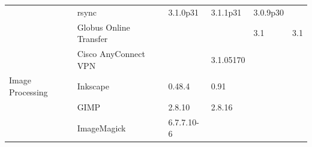 \begin{table}[!ht]
{\begin{tabular}{ll|l|l|l|l|}
\rowcolor{gray!25}
\cellcolor{white}                                                      & \multicolumn{1}{|l|}{rsync}                  & 3.1.0p31                                                            & 3.1.1p31                                                          & 3.0.9p30                                                               &                                                \\
\cline{2-6}
\cellcolor{white}                                                      & \multicolumn{1}{|l|}{Globus Online Transfer} &                                                                     &                                                                   & 3.1                                                                    & 3.1                                            \\
\cline{2-6}

\rowcolor{gray!25}
\cellcolor{white}                                                      & \multicolumn{1}{|l|}{Cisco AnyConnect VPN}   &                                                                     & 3.1.05170                                                         &                                                                        &                                                \\
\hline
\cellcolor{white} Image Processing                                     & \multicolumn{1}{|l|}{Inkscape}               & 0.48.4                                                              & 0.91                                                              &                                                                        &                                                \\
\cline{2-6}

\rowcolor{gray!25}
\cellcolor{white}                                                      & \multicolumn{1}{|l|}{GIMP}                   & 2.8.10                                                              & 2.8.16                                                            &                                                                        &                                                \\
\cline{2-6}
\cellcolor{white}                                                      & \multicolumn{1}{|l|}{ImageMagick}            & 6.7.7.10-6                                                          &                                                                   &                                                                        &                                                \\
\hline                                
\end{tabular}
}
\end{table}

